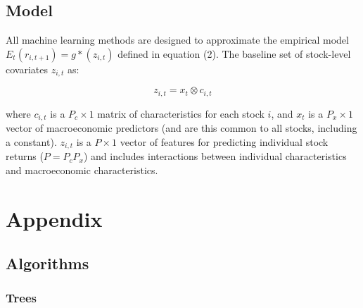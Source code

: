 \documentclass[man, a4paper, biblatex]{article}
\begin{document}
\subsection{Model}

All machine learning methods are designed to approximate the empirical model \( E_t(r_{i, t+1}) = g*(z_{i,t}) \) defined in equation (2). The baseline set of stock-level covariates \( z_{i,t} \) as:

\begin{equation}
	z_{i,t} = x_t \otimes c_{i,t}
\end{equation}

where \( c_{i,t} \) is a \( P_c \times 1 \) matrix of characteristics for each stock \(i\), and \(x_t\) is a $P_x \times 1$ vector of macroeconomic predictors (and are this common to all stocks, including a constant). $z_{i,t}$ is a $P \times 1$ vector of features for predicting individual stock returns ($P = P_cP_x$) and includes interactions between individual characteristics and macroeconomic characteristics. 

\cite{TESL}

\section{Appendix}

\subsection{Algorithms}

\subsubsection{Trees}
\end{document}

